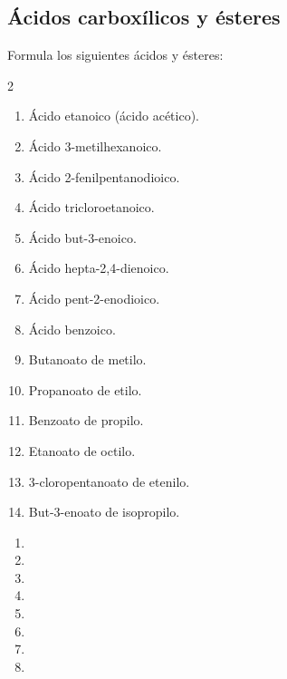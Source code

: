 \subsection*{Ácidos carboxílicos y ésteres}

\begin{exercise}
    Formula los siguientes ácidos y ésteres:
    \begin{multicols}{2}
        \begin{enumerate}[label=\alph*)]
            \item Ácido etanoico (ácido acético).
            \item Ácido 3-metilhexanoico.
            \item Ácido 2-fenilpentanodioico.
            \item Ácido tricloroetanoico.
            \item Ácido but-3-enoico.
            \item Ácido hepta-2,4-dienoico.
            \item Ácido pent-2-enodioico.
            \item Ácido benzoico.
            \item Butanoato de metilo.
            \item Propanoato de etilo.
            \item Benzoato de propilo.
            \item Etanoato de octilo.
            \item 3-cloropentanoato de etenilo.
            \item But-3-enoato de isopropilo.
        \end{enumerate}
    \end{multicols}
    \begin{solu}
        \begin{enumerate}[label=\alph*)]
            \item {}
            \item {}
            \item {}
            \item {}
            \item {}
            \item {}
            \item {}
            \item {}

\end{enumerate}
\end{solu}
\end{exercise}
